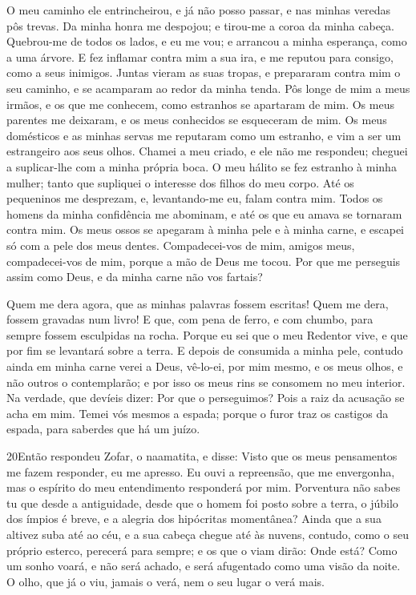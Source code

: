 O meu caminho ele entrincheirou, e já não posso passar, e nas
minhas veredas pôs trevas. Da minha honra me despojou; e
tirou-me a coroa da minha cabeça. Quebrou-me de todos os
lados, e eu me vou; e arrancou a minha esperança, como a uma árvore.
E fez inflamar contra mim a sua ira, e me reputou para
consigo, como a seus inimigos. Juntas vieram as suas tropas,
e prepararam contra mim o seu caminho, e se acamparam ao redor da
minha tenda. Pôs longe de mim a meus irmãos, e os que me
conhecem, como estranhos se apartaram de mim. Os meus
parentes me deixaram, e os meus conhecidos se esqueceram de mim.
Os meus domésticos e as minhas servas me reputaram como um
estranho, e vim a ser um estrangeiro aos seus olhos. Chamei a
meu criado, e ele não me respondeu; cheguei a suplicar-lhe com a
minha própria boca. O meu hálito se fez estranho à minha
mulher; tanto que supliquei o interesse dos filhos do meu corpo.
Até os pequeninos me desprezam, e, levantando-me eu, falam
contra mim. Todos os homens da minha confidência me abominam,
e até os que eu amava se tornaram contra mim. Os meus ossos
se apegaram à minha pele e à minha carne, e escapei só com a pele
dos meus dentes. Compadecei-vos de mim, amigos meus,
compadecei-vos de mim, porque a mão de Deus me tocou. Por que
me perseguis assim como Deus, e da minha carne não vos fartais?

Quem me dera agora, que as minhas palavras fossem escritas! Quem
me dera, fossem gravadas num livro! E que, com pena de ferro,
e com chumbo, para sempre fossem esculpidas na rocha. Porque
eu sei que o meu Redentor vive, e que por fim se levantará sobre a
terra. E depois de consumida a minha pele, contudo ainda em
minha carne verei a Deus, vê-lo-ei, por mim mesmo, e os meus
olhos, e não outros o contemplarão; e por isso os meus rins se
consomem no meu interior. Na verdade, que devíeis dizer: Por
que o perseguimos? Pois a raiz da acusação se acha em mim.
Temei vós mesmos a espada; porque o furor traz os castigos da
espada, para saberdes que há um juízo.

\medskip

\lettrine{20} Então respondeu Zofar, o naamatita, e disse:
Visto que os meus pensamentos me fazem responder, eu me apresso.
Eu ouvi a repreensão, que me envergonha, mas o espírito do meu
entendimento responderá por mim. Porventura não sabes tu que
desde a antiguidade, desde que o homem foi posto sobre a terra,
o júbilo dos ímpios é breve, e a alegria dos hipócritas
momentânea? Ainda que a sua altivez suba até ao céu, e a sua
cabeça chegue até às nuvens, contudo, como o seu próprio
esterco, perecerá para sempre; e os que o viam dirão: Onde está?
Como um sonho voará, e não será achado, e será afugentado como
uma visão da noite. O olho, que já o viu, jamais o verá, nem o
seu lugar o verá mais.

